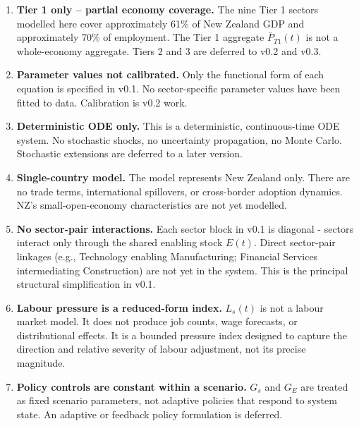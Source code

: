 \documentclass[11pt,a4paper]{article}
\begin{document}
\begin{enumerate}[label=\arabic*.]

  \item \textbf{Tier 1 only -- partial economy coverage.}
  The nine Tier 1 sectors modelled here cover approximately 61\% of New Zealand GDP and approximately 70\% of employment. The Tier 1 aggregate $\bar{P}_{T1}(t)$ is not a whole-economy aggregate. Tiers 2 and 3 are deferred to v0.2 and v0.3.

  \item \textbf{Parameter values not calibrated.}
  Only the functional form of each equation is specified in v0.1. No sector-specific parameter values have been fitted to data. Calibration is v0.2 work.

  \item \textbf{Deterministic ODE only.}
  This is a deterministic, continuous-time ODE system. No stochastic shocks, no uncertainty propagation, no Monte Carlo. Stochastic extensions are deferred to a later version.

  \item \textbf{Single-country model.}
  The model represents New Zealand only. There are no trade terms, international spillovers, or cross-border adoption dynamics. NZ's small-open-economy characteristics are not yet modelled.

  \item \textbf{No sector-pair interactions.}
  Each sector block in v0.1 is diagonal - sectors interact only through the shared enabling stock $E(t)$. Direct sector-pair linkages (e.g., Technology enabling Manufacturing; Financial Services intermediating Construction) are not yet in the system. This is the principal structural simplification in v0.1.

  \item \textbf{Labour pressure is a reduced-form index.}
  $L_s(t)$ is not a labour market model. It does not produce job counts, wage forecasts, or distributional effects. It is a bounded pressure index designed to capture the direction and relative severity of labour adjustment, not its precise magnitude.

  \item \textbf{Policy controls are constant within a scenario.}
  $G_s$ and $G_E$ are treated as fixed scenario parameters, not adaptive policies that respond to system state. An adaptive or feedback policy formulation is deferred.

\end{enumerate}
\end{document}
